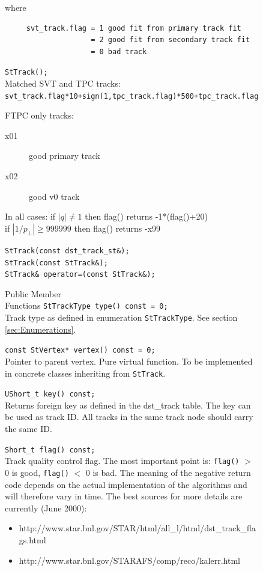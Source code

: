 \documentclass[twoside]{article}
\begin{document}
\begin{figure}[htb]
\begin{center}
     where
     \begin{verbatim}
     svt_track.flag = 1 good fit from primary track fit 
                    = 2 good fit from secondary track fit 
                    = 0 bad track 
     \end{verbatim}
    \verb+StTrack();+\\
     Matched SVT and TPC tracks:\\ 
     \texttt{svt\_track.flag*10+sign(1,tpc\_track.flag)*500+tpc\_track.flag}

     FTPC only tracks:
     \begin{description}
     \item[x01] good primary track 
     \item[x02] good v0 track 
     \end{description} 
     
     In all cases: 
     if $|q| \ne 1$ then flag() returns -1*(flag()+20)\\ 
     if $|1/p_\perp| \ge 999999$ then flag() returns -x99 

    \verb+StTrack(const dst_track_st&);+\\
    \verb+StTrack(const StTrack&);+\\
    \verb+StTrack& operator=(const StTrack&);+\\
\item[Public Member\\ Functions]
    \verb+StTrackType type() const = 0;+\\
    Track type as defined in enumeration \texttt{StTrackType}.
    See section \ref{sec:Enumerations}.
    
    \verb+const StVertex* vertex() const = 0;+\\
    Pointer to parent vertex.
    Pure virtual function. To be implemented in
    concrete classes inheriting from \texttt{StTrack}.
    
    \verb+UShort_t key() const;+\\
    Returns foreign key as defined in the dst\_track table.
    The key can be used as track ID. All tracks in the same
    track node should carry the same ID. 
    
    \verb+Short_t flag() const;+\\
    Track quality control flag.   The most important
    point is: \texttt{flag()} $>$ 0 is good, \texttt{flag()} $<$ 0 is bad.  The meaning
    of the negative return code depends on the actual implementation
    of the algorithms and will therefore vary in time.  The best
    sources for more details are currently (June 2000):    
    \begin{itemize}
    \item http://www.star.bnl.gov/STAR/html/all\_l/html/dst\_track\_flags.html
    \item http://www.star.bnl.gov/STARAFS/comp/reco/kalerr.html
    \end{itemize} 
     

\end{center}
\end{figure}
\end{document}
